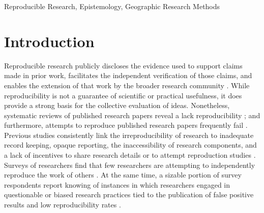 \documentclass[]{interact}
\theoremstyle{plain}%
\theoremstyle{definition}
\theoremstyle{remark}
\begin{document}
\begin{keywords}
Reproducible Research, Epistemology, Geographic Research Methods
\end{keywords}

\newpage
\section*{Introduction}
Reproducible research publicly discloses the evidence used to support claims made in prior work, facilitates the independent verification of those claims, and enables the extension of that work by the broader research community \citep{earp2015, nosek2012scientific, Schmidt2009}.
While reproducibility is not a guarantee of scientific or practical usefulness, it does provide a strong basis for the collective evaluation of ideas.
Nonetheless, systematic reviews of published research papers reveal a lack reproducibility \citep{moraila2014measuring, iqbal2016reproducible}; and furthermore, attempts to reproduce published research papers frequently fail \citep{raghupathi2022reproducibility, chang2015economics}.
Previous studies consistently link the irreproducibility of research to inadequate record keeping, opaque reporting, the inaccessibility of research components, and a lack of incentives to share research details or to attempt reproduction studies \citep{ranstam2000fraud, anderson2007normative, NASEM2019}.
Surveys of researchers find that few researchers are attempting to independently reproduce the work of others \citep{baker20161, boulbes2018survey}.
At the same time, a sizable portion of survey respondents report knowing of instances in which researchers engaged in questionable or biased research practices tied to the publication of false positive results and low reproducibility rates \citep{fanelli2009many, fraser2018questionable}.
\end{document}
